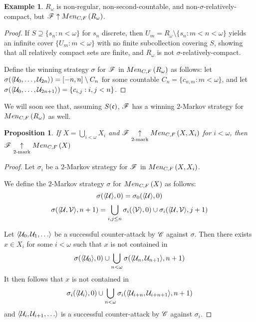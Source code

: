 \documentclass{amsart}
\newtheorem{proposition}[theorem]{Proposition}
\theoremstyle{definition}
\newtheorem{example}[theorem]{Example}
\begin{document}
\begin{example}
  \(R_\omega\) is non-regular, non-second-countable, and
  non-\(\sigma\)-relatively-compact, but \(\mathscr{F}\uparrow Men_{C,F}\left({R_\omega}\right)\).
\end{example}

\begin{proof}
  If \(S\supseteq\{s_n:n<\omega\}\) for \(s_n\)
  discrete, then \(U_m=R_\omega\setminus\{s_n:m<n<\omega\}\) yields an
  infinite cover \(\{U_m:m<\omega\}\) with no finite subcollection covering \(S\),
  showing that all relatively compact sets are finite, and \(R_\omega\) is not
  \(\sigma\)-relatively-compact.

  Define the winning strategy \(\sigma\) for \(\mathscr{F}\) in \(Men_{C,F}\left({R_\omega}\right)\) as
  follows: let \(\sigma(\langle\mathcal{U}_0,\dots,\mathcal{U}_{2n}\rangle)=[-n,n]\setminus C_n\)
  for some countable \(C_n=\{c_{n,m}: m<\omega\}\),
  and let \(\sigma(\langle\mathcal{U}_0,\dots,\mathcal{U}_{2n+1}\rangle)=\{c_{i,j} : i,j < n\}\).
\end{proof}

We will soon see that, assuming \(S(\mathfrak{c})\), \(\mathscr{F}\) has a winning
\(2\)-Markov strategy for \(Men_{C,F}\left({R_\omega}\right)\) as well.

\begin{proposition}
  If \(X=\bigcup_{i<\omega} X_i\) and \(\mathscr{F} \underset{2\text{-mark}}{\uparrow} Men_{C,F}\left({X,X_i}\right)\)
  for \(i<\omega\), then \(\mathscr{F} \underset{2\text{-mark}}{\uparrow} Men_{C,F}\left({X}\right)\)
\end{proposition}

\begin{proof}
  Let \(\sigma_i\) be a \(2\)-Markov strategy
  for \(\mathscr{F}\) in \(Men_{C,F}\left({X,X_i}\right)\).

  We define the \(2\)-Markov strategy
  \(\sigma\) for \(Men_{C,F}\left({X}\right)\) as follows:
    \[
      \sigma(\langle\mathcal{U}\rangle,0) = \sigma_0(\langle\mathcal{U}\rangle,0)
    \]
    \[
      \sigma(\langle\mathcal{U},\mathcal{V}\rangle,n+1)
        =
      \bigcup_{i,j\leq n}
      \sigma_i(\langle\mathcal{V}\rangle,0)
        \cup
      \sigma_i(\langle\mathcal{U},\mathcal{V}\rangle,j+1)
    \]

  Let \(\<\mc U_0,\mc U_1,\dots\>\) be a successful counter-attack by \(\mathscr{C}\)
  against \(\sigma\). Then there exists \(x\in X_i\) for
  some \(i<\omega\) such that \(x\) is not contained in
  \[
    \sigma(\langle\mathcal{U}_0\rangle,0)
      \cup
    \bigcup_{n<\omega}
    \sigma(\langle\mathcal{U}_n,\mathcal{U}_{n+1}\rangle,n+1)
  \]
  It then follows that \(x\) is not contained in
  \[
    \sigma_i(\langle\mathcal{U}_i\rangle,0)
      \cup
    \bigcup_{n<\omega}
    \sigma_i(\langle\mathcal{U}_{i+n},\mathcal{U}_{i+n+1}\rangle,n+1)
  \]
  and \(\<\mc U_i,\mc U_{i+1},\dots\>\) is a successful counter-attack
  by \(\mathscr{C}\) against \(\sigma_i\).
\end{proof}
\end{document}
